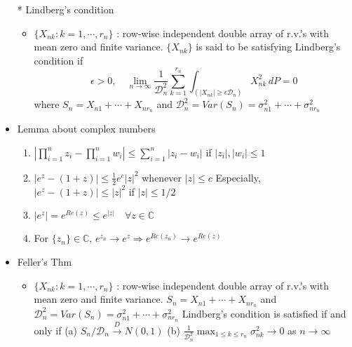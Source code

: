 \documentclass[12pt, A4]{article}
\begin{document}
\begin{itemize}
	\item[*] Lindberg's condition
	\begin{itemize}
		\item $\{X_{nk}:k=1,\cdots, r_n\}$ : row-wise independent double array of r.v.'s with mean zero and finite variance.  $\{X_{nk}\}$ is said to be satisfying Lindberg's condition if
		$$\epsilon>0, \quad 
		\lim_{n \to \infty}\frac{1}{\mathcal{D}_n^2}\sum_{k=1}^{r_n}\int_{(|X_{nk}|\geq \epsilon\mathcal{D}_n)} X_{nk}^2\,dP=0$$
		\newline where $S_n=X_{n1}+\cdots+X_{nr_n}$ and $\mathcal{D}_n^2=Var(S_n)=\sigma_{n1}^2+\cdots+\sigma_{nr_n}^2$
	\end{itemize}
	\item Lemma about complex numbers
	\begin{enumerate}
		\item $\left|\prod_{i=1}^{n}z_i-\prod_{i=1}^{n}w_i\right|\leq \sum_{i=1}^{n}|z_i-w_i|$ if $|z_i|,|w_i|\leq 1$
		\item $|e^z-(1+z)|\leq \frac12 e^c|z|^2$ whenever $|z|\leq c$
		\newline Especially, $|e^z-(1+z)|\leq |z|^2$ if $|z|\leq 1/2$
		\item $|e^z|=e^{Re(z)}\leq e^{|z|} \quad \forall z\in \mathbb{C}$
		\item For $\{z_n\}\in \mathbb{C}$, $e^{z_n}\rightarrow e^z \Rightarrow e^{Re(z_n)}\rightarrow e^{Re(z)}$
	\end{enumerate}
	\item Feller's Thm
	\begin{itemize}
		\item $\{X_{nk}:k=1,\cdots, r_n\}$ : row-wise independent double array of r.v.'s with mean zero and finite variance. $S_n=X_{n1}+\cdots+X_{nr_n}$ and $\mathcal{D}_n^2=Var(S_n)=\sigma_{n1}^2+\cdots+\sigma_{nr_n}^2$
		\newline Lindberg's condition is satisfied if and only if \newline(a) $S_n/\mathcal{D}_n \xrightarrow{D} N(0,1)$ \hspace{0,2cm}(b) $\frac{1}{\mathcal{D}_n^2}\max_{1\leq k\leq r_n}\sigma_{nk}^2\rightarrow0$ as $n\rightarrow \infty$
	\end{itemize}
	\clearpage


\end{itemize}
\end{document}
